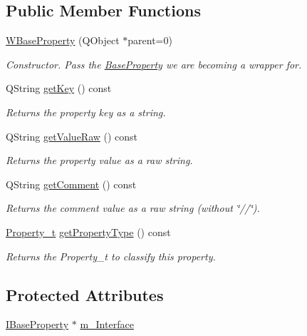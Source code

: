 \subsection*{Public Member Functions}
\begin{DoxyCompactItemize}
\item 
\hyperlink{class_w_base_property_a5f0a0f4e3f342d82ac9c9c45cb374c29}{W\-Base\-Property} (Q\-Object $\ast$parent=0)
\begin{DoxyCompactList}\small\item\em Constructor. Pass the \hyperlink{class_base_property}{Base\-Property} we are becoming a wrapper for. \end{DoxyCompactList}\item 
Q\-String \hyperlink{class_w_base_property_a4c0e55c7b0a19a7685b30a985b72524a}{get\-Key} () const 
\begin{DoxyCompactList}\small\item\em Returns the property key as a string. \end{DoxyCompactList}\item 
Q\-String \hyperlink{class_w_base_property_a49ba3186114cd7a0bb730a1a703af1eb}{get\-Value\-Raw} () const 
\begin{DoxyCompactList}\small\item\em Returns the property value as a raw string. \end{DoxyCompactList}\item 
Q\-String \hyperlink{class_w_base_property_a60750f9c78b6cbd7ec3fc1bfa9ae53fe}{get\-Comment} () const 
\begin{DoxyCompactList}\small\item\em Returns the comment value as a raw string (without \char`\"{}//\char`\"{}). \end{DoxyCompactList}\item 
\hyperlink{group___property_classes_ga38f1ccddda12c7cb50b868c9f789ee37}{Property\-\_\-t} \hyperlink{class_w_base_property_a1c0ae01f0eab91bff49f497f0ceba0de}{get\-Property\-Type} () const 
\begin{DoxyCompactList}\small\item\em Returns the Property\-\_\-t to classify this property. \end{DoxyCompactList}\end{DoxyCompactItemize}
\subsection*{Protected Attributes}
\begin{DoxyCompactItemize}
\item 
\hyperlink{class_i_base_property}{I\-Base\-Property} $\ast$ \hyperlink{class_w_base_property_a8c25b5b13019cf65037147da7b03c643}{m\-\_\-\-Interface}
\end{DoxyCompactItemize}


